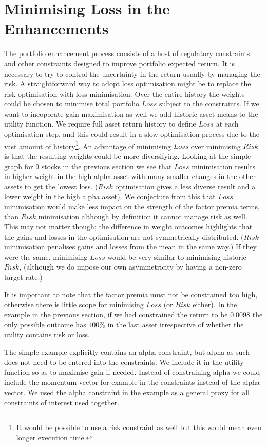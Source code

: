 \documentclass[12pt]{article}
\begin{document}
\section{Minimising Loss in the Enhancements}
The portfolio enhancement process consists of a host of regulatory constraints and other constraints 
designed to improve portfolio expected return. It is necessary to try to control the uncertainty in the return usually 
by managing the risk.
A straightforward way to adopt loss optimisation might be to replace the risk optimisation with loss minimisation.
Over the entire history the weights could be chosen to minimise total portfolio $Loss$ subject to the constraints.
If we want to incoporate gain maximisation as well we add historic asset means to the utility function.
We require full asset return history to define $Loss$ at each optimisation step,
and this could 
result in a slow optimisation process due to the vast amount of history\footnote{It would be possible 
to use a risk constraint as well but this would mean even longer execution time.}.  An advantage of
minimising $Loss$ over minimising $Risk$ is that the resulting weights could
be more diversifying. Looking at the simple graph for 9 stocks in the previous section we see that
$Loss$ minimisation results in higher weight in the high alpha asset with many 
smaller changes in the other assets to get the lowest loss. ($Risk$ optimisation gives a less diverse
result and a lower weight in the high alpha asset). We conjecture from this that $Loss$ minimisation 
would make less impact on the strength of the factor premia terms, than $Risk$ minimisation although by definition it cannot
manage risk as well. This may not matter though; the difference in weight outcomes
highlights that the gains and losses in the optimisation are not symmetrically
distributed. ($Risk$ minimisation penalises gains and losses from the mean in the same way.) If they were the same, minimising $Loss$ would be very similar to minimising historic $Risk$, (although
we do impose our own asymmetricity by having a non-zero target rate.) 

It is important
to note that the factor premia must not be constrained too high, otherwise there is little scope 
for minimising $Loss$ (or $Risk$ either). In the example in the previous section,
if we had constrained the return to be $0.0098$ the only possible outcome has $100\%$ in 
the last asset irrespective of whether the utility contains risk or loss.

The simple example explicitly contains an alpha constraint, but alpha as such does not need to 
be entered into the constraints. We include it in the utility function so as to maximise gain if needed. 
Instead of constraining alpha we could include the momentum 
vector for example in the constraints instead of the alpha vector. We used the alpha constraint in the example as a general proxy for all 
constraints of interest used together.
\end{document}
